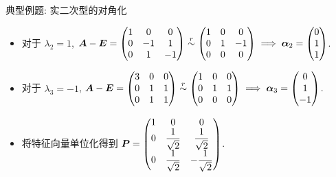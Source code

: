 \begin{frame}{典型例题: 实二次型的对角化}
	\onslide<+->
	\begin{solution}[续解]
		\begin{itemize}
			\item 对于 $\lambda_2=1$, ${\boldsymbol{A}}-{\boldsymbol{E}}=\begin{pmatrix}
				1&0&0\\
				0&-1&1\\
				0&1&-1
			\end{pmatrix}\mathrel{\overset{r}{\sim}}\begin{pmatrix}
				1&0&0\\
				0&1&-1\\
				0&0&0
			\end{pmatrix}\implies{\boldsymbol{\alpha}}_2=\begin{pmatrix}
				0\\1\\1
			\end{pmatrix}$.
			\item 对于 $\lambda_3=-1$, ${\boldsymbol{A}}-{\boldsymbol{E}}=\begin{pmatrix}
				3&0&0\\
				0&1&1\\
				0&1&1
			\end{pmatrix}\mathrel{\overset{r}{\sim}}\begin{pmatrix}
				1&0&0\\
				0&1&1\\
				0&0&0
			\end{pmatrix}\implies{\boldsymbol{\alpha}}_3=\begin{pmatrix}
				0\\1\\-1
			\end{pmatrix}$.
			\item 将特征向量单位化得到 ${\boldsymbol{P}}=\begin{pmatrix}
				1&0&0\\
				0&\dfrac1{\sqrt2}&\dfrac1{\sqrt2}\\
				0&\dfrac1{\sqrt2}&-\dfrac1{\sqrt2}
			\end{pmatrix}$.
		\end{itemize}
	\end{solution}
\end{frame}


